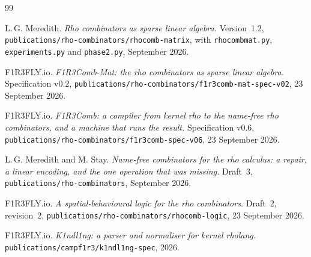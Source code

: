 \documentclass[11pt,a4paper]{article}
\newcommand{\code}[1]{\texttt{#1}}
\theoremstyle{definition}
\theoremstyle{plain}
\begin{document}
\begin{thebibliography}{99}

 L.\,G. Meredith.
\emph{Rho combinators as sparse linear algebra.} Version~1.2,
\code{publications/rho-combinators/rhocomb-matrix}, with \code{rhocombmat.py},
\code{experiments.py} and \code{phase2.py}, September 2026.

 F1R3FLY.io.
\emph{F1R3Comb-Mat: the rho combinators as sparse linear algebra.}
Specification v0.2, \code{publications/rho-combinators/f1r3comb-mat-spec-v02},
23 September 2026.

 F1R3FLY.io.
\emph{F1R3Comb: a compiler from kernel rho to the name-free rho combinators,
and a machine that runs the result.} Specification v0.6,
\code{publications/rho-combinators/f1r3comb-spec-v06}, 23 September 2026.

 L.\,G. Meredith and M. Stay.
\emph{Name-free combinators for the rho calculus: a repair, a linear encoding,
and the one operation that was missing.} Draft~3,
\code{publications/rho-combinators}, September 2026.

 F1R3FLY.io.
\emph{A spatial-behavioural logic for the rho combinators.} Draft~2,
revision~2, \code{publications/rho-combinators/rhocomb-logic}, 23 September
2026.

 F1R3FLY.io.
\emph{K1ndl1ng: a parser and normaliser for kernel rholang.}
\code{publications/campf1r3/k1ndl1ng-spec}, 2026.

\end{thebibliography}
\end{document}
